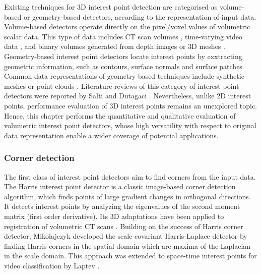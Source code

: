 Existing techniques for 3D interest point detection are categorised as volume-based or geometry-based detectors, according to the representation of input data. Volume-based detectors operate directly on the pixel/voxel values of volumetric scalar data. This type of data includes CT scan volumes \cite{Flitton2010}, time-varying video data \cite{Koelstra2009, Laptev2005, Willems2008, Yu2010}, and binary volumes generated from depth images \cite{Viksten2008} or 3D meshes \cite{Knopp2010}.  
Geometry-based interest point detectors locate interest points by exxtracting geometric information, such as contours, surface normals and surface patches. 
Common data representations of geometry-based techniques include synthetic meshes \cite{Glomb2009,Sipiran2011,Zaharescu2009} or point clouds \cite{Unnikrishnan2008,Aanaes2012}. 
Literature reviews of this category of interest point detectors were reported by Salti \etal \cite{Salti2011} and Dutagaci \etal \cite{Dutagaci2011}.  
Nevertheless, unlike 2D interest points, performance evaluation of 3D interest points remains an unexplored topic. 
Hence, this chapter performs the quantitative and qualitative evaluation of volumetric interest point detectors, whose high versatility with respect to original data representation enable a wider coverage of potential applications.


\subsubsection{Corner detection}
The first class of interest point detectors aim to find corners from the input data.
The Harris interest point detector \cite{Harris1988} is a classic image-based corner detection algorithm, which finds points of large gradient changes in orthogonal directions. It detects interest points by analyzing the eigenvalues of the second moment matrix (first order derivative). Its 3D adaptations have been applied to registration of volumetric CT scans \cite{Ruiz-Alzola2001, Dalvi2010}.  
Building on the success of Harris corner detector, Mikolajczyk \cite{Mikolajczyk2004} developed the scale-covariant Harris-Laplace detector by finding Harris corners in the spatial domain which are maxima of the Laplacian in the scale domain. 
This approach was extended to space-time interest points for video classification by Laptev \cite{Laptev2005}. 

